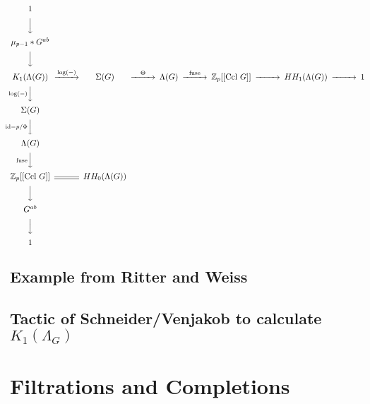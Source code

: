 $$\begin{CD}
1          \\
@VVV\\
\mu_{p-1} * G^{ab}\\
@VVV\\
K_1(\Lambda(G)) @>{\text{log}(-)}>> \Sigma(G) @>\Theta>> \Lambda(G) @>\text{fuse}>> \ZP[[\text{Ccl } G]]  @>>> HH_1(\Lambda(G)) @>>> 1\\
@V{\text{log}(-)}VV \\
\Sigma(G)\\
@V{\text{id}-p/\Phi}VV\\
\Lambda(G)\\
@V{\text{fuse}}VV\\
\ZP[[\text{Ccl } G]] @= HH_0( \Lambda(G))\\
@VVV \\
G^{ab} \\
@VVV \\
1 
\end{CD}$$


\subsection{Example from Ritter and Weiss}
\subsection{Tactic of Schneider/Venjakob to calculate $K_1(\Lambda_G)$}


\section{Filtrations and Completions}
